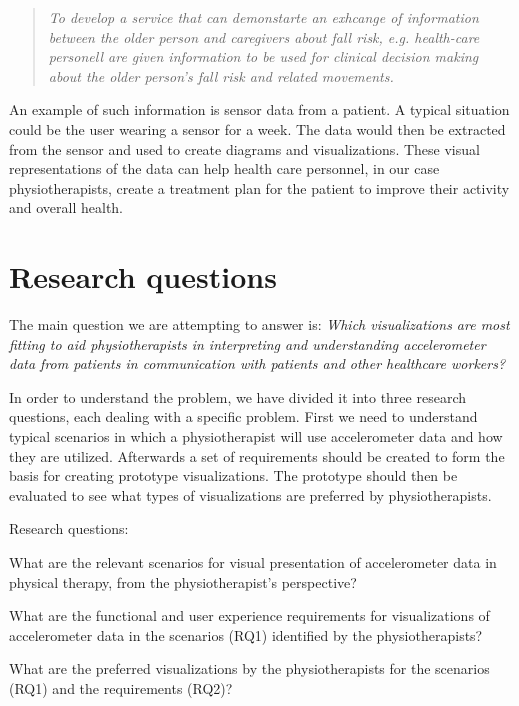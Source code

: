 \begin{quote}
\textit{To develop a service that can demonstarte an exhcange of information between the older person and caregivers about fall risk, e.g. health-care personell are given information to be used for clinical decision making about the older person's fall risk and related movements.}
\end{quote}

An example of such information is sensor data from a patient. A typical situation could be the user wearing a sensor for a week. The data would then be extracted from the sensor and used to create diagrams and visualizations. These visual representations of the data can help health care personnel, in our case physiotherapists, create a treatment plan for the patient to improve their activity and overall health. 

\section{Research questions}
\label{sec:researchQuestions}
The main question we are attempting to answer is: \textit{Which visualizations are most fitting to aid physiotherapists in interpreting and understanding accelerometer data from patients in communication with patients and other healthcare workers?}

In order to understand the problem, we have divided it into three research questions, each dealing with a specific problem. First we need to understand typical scenarios in which a physiotherapist will use accelerometer data and how they are utilized. Afterwards a set of requirements should be created to form the basis for creating prototype visualizations. The prototype should then be evaluated to see what types of visualizations are preferred by physiotherapists.

Research questions:
\vspace{-15pt}
\begin{description}[parsep=0pt, itemsep=0pt]
\item[Research Question 1:] What are the relevant scenarios for visual presentation of accelerometer data in physical therapy, from the physiotherapist's perspective?

\item[Research Question 2:] What are the functional and user experience requirements for visualizations of accelerometer data in the scenarios (RQ1) identified by the physiotherapists?

\item[Research Question 3:] What are the preferred visualizations by the physiotherapists for the scenarios (RQ1) and the requirements (RQ2)?
\end{description}

